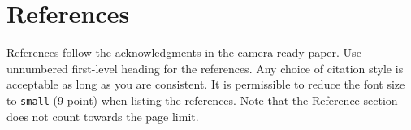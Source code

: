 \documentclass{article}
\begin{document}





\section*{References}


References follow the acknowledgments in the camera-ready paper. Use unnumbered first-level heading for
the references. Any choice of citation style is acceptable as long as you are
consistent. It is permissible to reduce the font size to \verb+small+ (9 point)
when listing the references.
Note that the Reference section does not count towards the page limit.
\medskip
\end{document}
